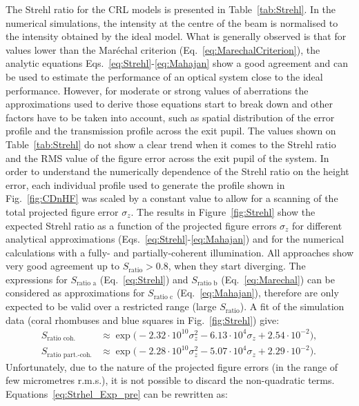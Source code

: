 \begin{refsection}
The Strehl ratio for the CRL models is presented in Table~\ref{tab:Strehl}. In the numerical simulations, the intensity at the centre of the beam is normalised to the intensity obtained by the ideal model. What is generally observed is that for values lower than the  Mar\'echal criterion (Eq.~\ref{eq:MarechalCriterion}), the analytic equations Eqs.~\ref{eq:Strehl}-\ref{eq:Mahajan} show a good agreement and can be used to estimate the performance of an optical system close to the ideal performance. However, for moderate or strong values of aberrations the approximations used to derive those equations start to break down and other factors have to be taken into account, such as spatial distribution of the error profile and the transmission profile across the exit pupil. The values shown on Table~\ref{tab:Strehl} do not show a clear trend when it comes to the Strehl ratio and the RMS value of the figure error across the exit pupil of the system. In order to understand the numerically dependence of the Strehl ratio on the height error, each individual profile used to generate the profile shown in Fig.~\ref{fig:CDnHF} was scaled by a constant value to allow for a scanning of the total projected figure error $\sigma_z$. The results in Figure~\ref{fig:Strehl} show the expected Strehl ratio as a function of the projected figure errors $\sigma_z$ for different analytical approximations (Eqs.~\ref{eq:Strehl}-\ref{eq:Mahajan}) and for the numerical calculations with a fully- and partially-coherent illumination. All approaches show very good agreement up to $S_\text{ratio}>0.8$, when they start diverging. The expressions for $S_\text{ratio a}$ (Eq.~\ref{eq:Strehl}) and  $S_\text{ratio b}$ (Eq.~\ref{eq:Marechal}) can be considered as approximations for $S_\text{ratio c}$ (Eq.~\ref{eq:Mahajan}), therefore are only expected to be valid over a restricted range (large $S_\text{ratio}$). A fit of the simulation data (coral rhombuses and blue squares in Fig.~\ref{fig:Strehl}) give:
\begin{subequations}\label{eq:Strhel_Exp_pre}
\begin{align}
    S_{\text{ratio coh.}}&\approx\exp{\big(-2.32\cdot10^{10}\sigma_z^2 -6.13\cdot10^4\sigma_z + 2.54\cdot10^{-2}\big)},\\
    S_{\text{ratio part.-coh.}}&\approx\exp{\big(-2.28\cdot10^{10}\sigma_z^2 -5.07\cdot10^4\sigma_z + 2.29\cdot10^{-2}\big)}.
\end{align}
\end{subequations}
Unfortunately, due to the nature of the projected figure errors (in the range of few micrometres r.m.s.), it is not possible to discard the non-quadratic terms. Equations~\ref{eq:Strhel_Exp_pre} can be rewritten as:

\end{refsection}
